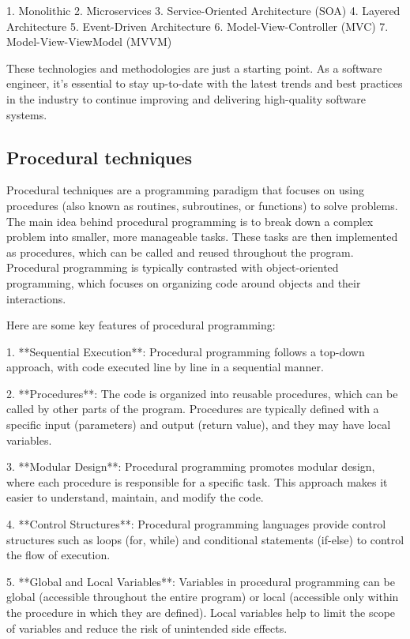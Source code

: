 \documentclass{article}
\begin{document}
1. Monolithic
2. Microservices
3. Service-Oriented Architecture (SOA)
4. Layered Architecture
5. Event-Driven Architecture
6. Model-View-Controller (MVC)
7. Model-View-ViewModel (MVVM)

These technologies and methodologies are just a starting point. As a software engineer, it's essential to stay up-to-date with the latest trends and best practices in the industry to continue improving and delivering high-quality software systems.


\subsection{Procedural techniques}

Procedural techniques are a programming paradigm that focuses on using procedures (also known as routines, subroutines, or functions) to solve problems. The main idea behind procedural programming is to break down a complex problem into smaller, more manageable tasks. These tasks are then implemented as procedures, which can be called and reused throughout the program. Procedural programming is typically contrasted with object-oriented programming, which focuses on organizing code around objects and their interactions.

Here are some key features of procedural programming:

1. **Sequential Execution**: Procedural programming follows a top-down approach, with code executed line by line in a sequential manner.

2. **Procedures**: The code is organized into reusable procedures, which can be called by other parts of the program. Procedures are typically defined with a specific input (parameters) and output (return value), and they may have local variables.

3. **Modular Design**: Procedural programming promotes modular design, where each procedure is responsible for a specific task. This approach makes it easier to understand, maintain, and modify the code.

4. **Control Structures**: Procedural programming languages provide control structures such as loops (for, while) and conditional statements (if-else) to control the flow of execution.

5. **Global and Local Variables**: Variables in procedural programming can be global (accessible throughout the entire program) or local (accessible only within the procedure in which they are defined). Local variables help to limit the scope of variables and reduce the risk of unintended side effects.
\end{document}
